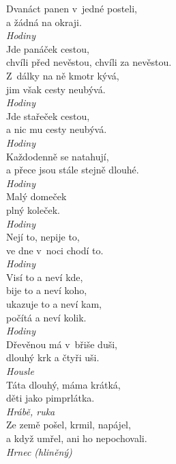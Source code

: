 \begin{multicols}{4}
\noindent
Dvanáct panen v~jedné posteli,\\
a žádná na okraji.\\[1 mm]
{\sl Hodiny}\\

\noindent
Jde panáček cestou,\\
chvíli před nevěstou, chvíli za nevěstou.\\
Z~dálky na ně kmotr kývá,\\
jim však cesty neubývá.\\[1 mm]
{\sl Hodiny}\\

\noindent
Jde stařeček cestou,\\
a nic mu cesty neubývá.\\[1 mm]
{\sl Hodiny}\\

\noindent
Každodenně se natahují,\\
a přece jsou stále stejně dlouhé.\\[1 mm]
{\sl Hodiny}\\

\noindent
Malý domeček\\
plný koleček.\\[1 mm]
{\sl Hodiny}\\

\noindent
Nejí to, nepije to,\\
ve dne v~noci chodí to.\\[1 mm]
{\sl Hodiny}\\

\noindent
Visí to a neví kde,\\
bije to a neví koho,\\
ukazuje to a neví kam,\\
počítá a neví kolik.\\[1 mm]
{\sl Hodiny}\\

\noindent
Dřevěnou má v~břiše duši,\\
dlouhý krk a čtyři uši.\\[1 mm]
{\sl Housle}\\

\noindent
Táta dlouhý, máma krátká,\\
děti jako pimprlátka.\\[1 mm]
{\sl Hrábě, ruka}\\

\noindent
Ze země pošel, krmil, napájel,\\
a když umřel, ani ho nepochovali.\\[1 mm]
{\sl Hrnec (hliněný)}\\


\end{multicols}
